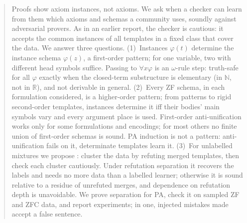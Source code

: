 \begin{abstract}
\noindent Proofs show axiom instances, not axioms. We ask when a checker can learn from them which axioms and schemas a
community uses, soundly against adversarial provers. As in an earlier report, the checker is cautious: it accepts the
common instances of all templates in a fixed class that cover the data. We answer three questions.
(1)~Instances $\varphi(t)$ determine the instance schema $\varphi(z)$, a first-order pattern; for one variable, two with
different head symbols suffice. Passing to $\forall x\varphi$ is an $\omega$-rule step: truth-safe for all $\varphi$
exactly when the closed-term substructure is elementary (in $\mathbb N$, not in $\mathbb R$), and not derivable in
general.
(2)~Every ZF schema, in each formulation considered, is a higher-order pattern; from patterns to rigid second-order
templates, instances determine it iff their bodies' main symbols vary and every argument place is used. First-order
anti-unification works only for some formulations and encodings; for most others no finite union of first-order schemas
is sound. PA induction is not a pattern: anti-unification fails on it, determinate templates learn it.
(3)~For unlabelled mixtures we propose \DTRC{}: cluster the data by refuting merged templates, then check each cluster
cautiously. Under refutation separation it recovers the labels and needs no more data than a labelled learner; otherwise
it is sound relative to a residue of unrefuted merges, and dependence on refutation depth is unavoidable. We prove
separation for PA, check it on sampled ZF and ZFC data, and report experiments; in one, injected mistakes made \DTRC{}
accept a false sentence.
\end{abstract}
